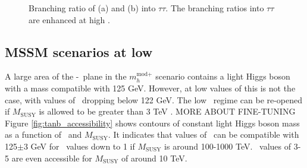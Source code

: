 \begin{figure}[h!]
\begin{center}
\end{center}
\caption{Branching ratio of (a) \PHiggs and (b) \PHiggsps into $\tau\tau$. The branching
ratios into $\tau\tau$ are enhanced at high \tanb.}
\label{fig:mhmodp_br}
\end{figure}


\subsection{MSSM scenarios at low \tanb}
A large area of the \mA-\tanb~plane in the $m_{h}^{\text{mod+}}$ 
scenario contains a light Higgs boson with a mass compatible with
125 GeV. However, at low values of \tanb this is not the case, with
values of \mh~dropping below 122 GeV. The low \tanb~regime can be re-opened
if $M_{\text{SUSY}}$ is allowed to be greater than 3 TeV \cite{MSSM-reopen}. 
MORE ABOUT FINE-TUNING
Figure \ref{fig:tanb_accessibility} shows contours of constant
light Higgs boson mass as a function of \tanb~and $M_{\text{SUSY}}$.
It indicates that values of \mh~can be compatible with 125$\pm$3 GeV
for \tanb~values down to 1 if $M_{\text{SUSY}}$ is around 100-1000 TeV. 
\tanb~values of 3-5 are even accessible for $M_{\text{SUSY}}$ of around 10 TeV.

